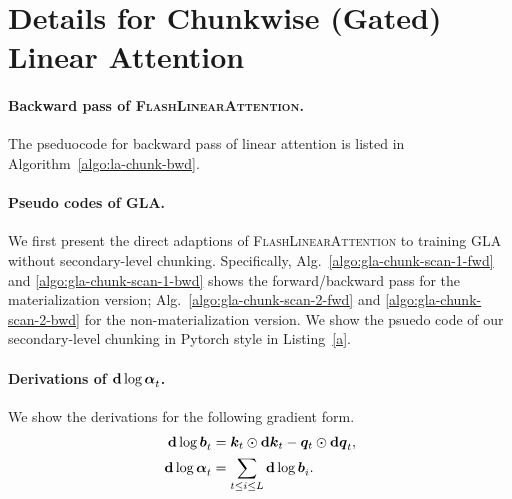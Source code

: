 \section{Details for Chunkwise (Gated) Linear Attention}
\paragraph{Backward pass of \textsc{FlashLinearAttention}.}  
The pseduocode for backward pass of linear attention is listed in Algorithm~\ref{algo:la-chunk-bwd}.


\paragraph{Pseudo codes of GLA.}
We first present the direct adaptions of \textsc{FlashLinearAttention} to training GLA without secondary-level chunking. 
Specifically, 
Alg.~\ref{algo:gla-chunk-scan-1-fwd} and \ref{algo:gla-chunk-scan-1-bwd} shows the forward/backward pass for the materialization version; Alg.~\ref{algo:gla-chunk-scan-2-fwd} and \ref{algo:gla-chunk-scan-2-bwd} for the non-materialization version.
%
%
%
%
We show the psuedo code of our secondary-level chunking in Pytorch style in Listing~\ref{a}.








\paragraph{Derivations of ${\mathbf{d}\log\bm{\alpha}}_t$.}

We show the derivations for the following gradient form.
\begin{align*}
    {\mathbf{d}\log\bm{b}}_t &= {\bm{k}}_t \odot {\mathbf{d}\bm{k}}_t - {\bm{q}}_t \odot {\mathbf{d}\bm{q}}_t, \\
   {\mathbf{d}\log\bm{\alpha}}_t  &= \sum_{t \leq i \leq L} {\mathbf{d}\log\bm{b}}_i.
\end{align*}

